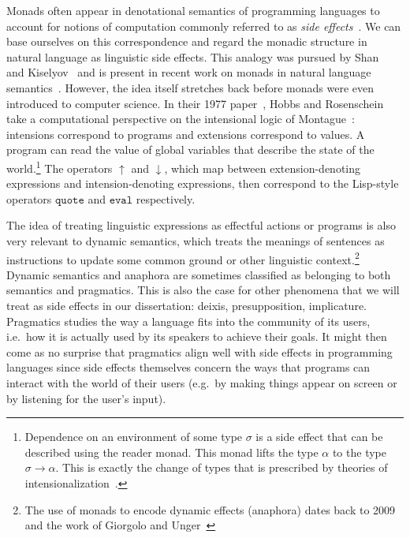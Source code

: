 Monads often appear in denotational semantics of programming languages to
account for notions of computation commonly referred to as \emph{side
  effects}~\cite{moggi1991notions}. We can base ourselves on this
correspondence and regard the monadic structure in natural language as
linguistic side effects. This analogy was pursued by
Shan~\cite{shan2005linguistic,shan2005thesis} and
Kiselyov~\cite{kiselyov2008call} and is present in recent work on monads in
natural language
semantics~\cite{giorgolo2012monads,charlow2014semantics}. However, the idea
itself stretches back before monads were even introduced to computer
science. In their 1977 paper~\cite{hobbs1977making}, Hobbs and Rosenschein
take a computational perspective on the intensional logic of
Montague~\cite{montague1973proper}: intensions correspond to programs and
extensions correspond to values. A program can read the value of global
variables that describe the state of the world.\footnote{Dependence on an
  environment of some type $\sigma$ is a side effect that can be described
  using the reader monad. This monad lifts the type $\alpha$ to the type
  $\sigma \to \alpha$. This is exactly the change of types that is
  prescribed by theories of
  intensionalization~\cite{ben2007semantics,de2013note}.} The operators
$\uparrow$ and $\downarrow$, which map between extension-denoting
expressions and intension-denoting expressions, then correspond to the
Lisp-style operators $\texttt{quote}$ and $\texttt{eval}$ respectively.

The idea of treating linguistic expressions as effectful actions or
programs is also very relevant to dynamic semantics, which treats the
meanings of sentences as instructions to update some common ground or other
linguistic context.\footnote{The use of monads to encode dynamic effects
  (anaphora) dates back to 2009 and the work of Giorgolo and
  Unger~\cite{giorgolo2009coreference,unger2012dynamic}} Dynamic semantics
and anaphora are sometimes classified as belonging to both semantics and
pragmatics. This is also the case for other phenomena that we will treat as
side effects in our dissertation: deixis, presupposition,
implicature. Pragmatics studies the way a language fits into the community
of its users, i.e.\ how it is actually used by its speakers to achieve
their goals. It might then come as no surprise that pragmatics align well
with side effects in programming languages since side effects themselves
concern the ways that programs can interact with the world of their users
(e.g.\ by making things appear on screen or by listening for the user's
input).


